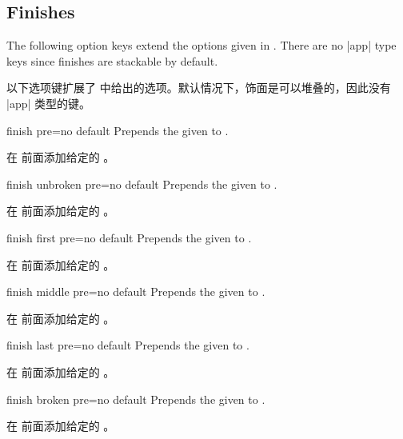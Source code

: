 \subsection{Finishes}
The following option keys extend the options given in .
There are no |app| type keys since finishes are stackable by default.

以下选项键扩展了  中给出的选项。默认情况下，饰面是可以堆叠的，因此没有 |app| 类型的键。
\begin{docTcbKey}{finish pre}{=}{no default}
Prepends the given  to .

在  前面添加给定的 。
\end{docTcbKey}

\begin{docTcbKey}{finish unbroken pre}{=}{no default}
Prepends the given  to .

在  前面添加给定的 。
\end{docTcbKey}

\begin{docTcbKey}{finish first pre}{=}{no default}
Prepends the given  to .

在  前面添加给定的 。
\end{docTcbKey}

\begin{docTcbKey}{finish middle pre}{=}{no default}
Prepends the given  to .

在  前面添加给定的 。
\end{docTcbKey}

\begin{docTcbKey}{finish last pre}{=}{no default}
Prepends the given  to .

在  前面添加给定的 。
\end{docTcbKey}

\begin{docTcbKey}{finish broken pre}{=}{no default}
Prepends the given  to .

在  前面添加给定的 。
\end{docTcbKey}

